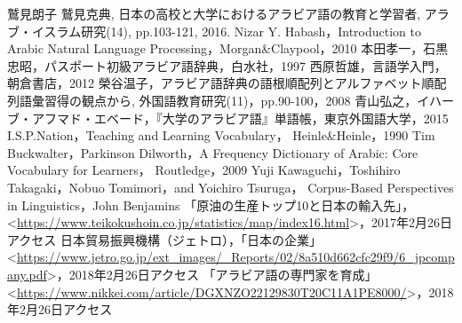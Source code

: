 \documentclass[technicalreport]{ieicej}
\begin{document}
\begin{thebibliography}{99}
鷲見朗子 鷲見克典, 日本の高校と大学におけるアラビア語の教育と学習者, アラブ・イスラム研究(14), pp.103-121, 2016.
Nizar Y. Habash，Introduction to Arabic Natural Language Processing，Morgan\&Claypool，2010
本田孝一，石黒忠昭，パスポート初級アラビア語辞典，白水社，1997
西原哲雄，言語学入門，朝倉書店，2012
榮谷温子，アラビア語辞典の語根順配列とアルファベット順配列語彙習得の観点から, 外国語教育研究(11)，pp.90-100，2008
青山弘之，イハーブ・アフマド・エベード，『大学のアラビア語』単語帳，東京外国語大学，2015
I.S.P.Nation，Teaching and Learning Vocabulary， Heinle\&Heinle，1990
Tim Buckwalter，Parkinson Dilworth，A Frequency Dictionary of Arabic: Core Vocabulary for Learners， Routledge，2009
Yuji Kawaguchi，Toshihiro Takagaki，Nobuo Tomimori，and Yoichiro Tsuruga，
Corpus-Based Perspectives in Linguistics，John Benjamins
「原油の生産トップ10と日本の輸入先」， \textless \url{https://www.teikokushoin.co.jp/statistics/map/index16.html}\textgreater，2017年2月26日アクセス
 日本貿易振興機構（ジェトロ），「日本の企業」\textless \url{https://www.jetro.go.jp/ext_images/_Reports/02/8a510d662cfc29f9/6_jpcompany.pdf}\textgreater，2018年2月26日アクセス
「アラビア語の専門家を育成」\textless \url{https://www.nikkei.com/article/DGXNZO22129830T20C11A1PE8000/}\textgreater，2018年2月26日アクセス
\end{thebibliography}
\end{document}
